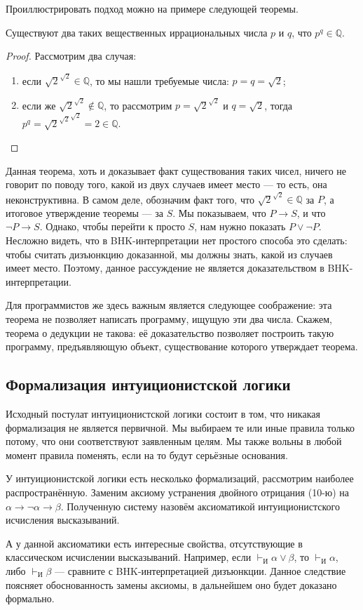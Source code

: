 Проиллюстрировать подход можно на примере следующей теоремы.

\begin{theorem}
Существуют два таких вещественных иррациональных числа $p$ и $q$, что $p^q \in \mathbb{Q}$.
\end{theorem}

\begin{proof}
Рассмотрим два случая:
\begin{enumerate}
\item если $\sqrt{2}^{\sqrt{2}} \in \mathbb{Q}$, то мы нашли требуемые числа: $p = q = \sqrt{2}$;
\item если же $\sqrt{2}^{\sqrt{2}} \notin \mathbb{Q}$, то рассмотрим $p = \sqrt{2}^{\sqrt{2}}$
и $q = \sqrt{2}$, тогда $p^q = {\sqrt{2}^{\sqrt{2}}}^{\sqrt{2}} = 2 \in \mathbb{Q}$.
\end{enumerate}
\end{proof}

Данная теорема, хоть и доказывает факт существования таких чисел, ничего не говорит по поводу
того, какой из двух случаев имеет место --- то есть, она неконструктивна. 
В самом деле, 
обозначим факт того, что $\sqrt{2}^{\sqrt{2}} \in \mathbb{Q}$ за $P$, а итоговое утверждение теоремы
--- за $S$. Мы показываем, что $P \rightarrow S$, и что $\neg P \rightarrow S$.
Однако, чтобы перейти к просто $S$, нам нужно показать $P \vee \neg P$. Несложно видеть,
что в BHK-интерпретации нет простого способа это сделать: чтобы считать дизъюнкцию доказанной,
мы должны знать, какой из случаев имеет место. Поэтому, данное рассуждение не является
доказательством в BHK-интерпретации.

Для программистов же здесь важным является следующее соображение: эта теорема не 
позволяет написать программу, ищущую эти два числа. Скажем, теорема о дедукции не такова: 
её доказательство позволяет построить такую программу, предъявляющую объект,
существование которого утверждает теорема. 

\subsection*{Формализация интуиционистской логики}

Исходный постулат интуиционистской логики состоит в том, что никакая формализация не является
первичной. Мы выбираем те или иные правила только потому, что они соответствуют заявленным
целям. Мы также вольны в любой момент правила поменять, если на то будут серьёзные основания.

У интуиционистской логики есть несколько формализаций, рассмотрим наиболее распространённую.
Заменим аксиому устранения двойного отрицания (10-ю) на 
$\alpha \rightarrow \neg \alpha \rightarrow \beta$.
Полученную систему назовём аксиоматикой интуиционистского исчисления высказываний.

А у данной аксиоматики есть интересные свойства, отсутствующие в классическом исчислении
высказываний. Например, если $\vdash_\texttt{И} \alpha \vee \beta$, то $\vdash_\texttt{И} \alpha$, либо
$\vdash_\texttt{И} \beta$ --- сравните с BHK-интерпретацией дизъюнкции. 
Данное следствие поясняет обоснованность замены аксиомы, в дальнейшем оно будет доказано
формально.
